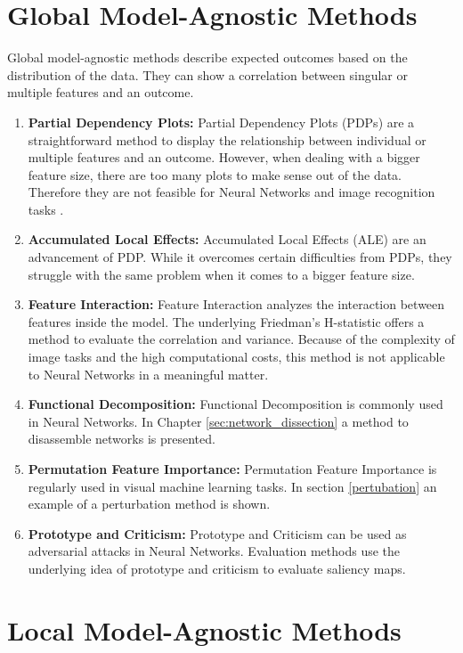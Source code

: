 \section{Global Model-Agnostic Methods}

Global model-agnostic methods describe expected outcomes based on the distribution of the data. They can show a correlation between singular or multiple features and an outcome.

\begin{enumerate}
	\item \textbf{Partial Dependency Plots:} Partial Dependency Plots (PDPs) are a straightforward method to display the relationship between individual or multiple features and an outcome. However, when dealing with a bigger feature size, there are too many plots to make sense out of the data. Therefore they are not feasible for Neural Networks and image recognition tasks \cite{PDP}.
	\item \textbf{Accumulated Local Effects:} Accumulated Local Effects (ALE) are an advancement of PDP. While it overcomes certain difficulties from PDPs, they struggle with the same problem when it comes to a bigger feature size.
	\item \textbf{Feature Interaction:} Feature Interaction analyzes the interaction between features inside the model. The underlying Friedman's H-statistic offers a method to evaluate the correlation and variance. Because of the complexity of image tasks and the high computational costs, this method is not applicable to Neural Networks in a meaningful matter.
	\item \textbf{Functional Decomposition:} Functional Decomposition is commonly used in Neural Networks. In Chapter \ref{sec:network_dissection} a method to disassemble networks is presented.
	\item \textbf{Permutation Feature Importance:} Permutation Feature Importance is regularly used in visual machine learning tasks. In section \ref{pertubation} an example of a perturbation method is shown.
	\item \textbf{Prototype and Criticism:} Prototype and Criticism can be used as adversarial attacks in Neural Networks. \cite{xu2019adversarial} Evaluation methods use the underlying idea of prototype and criticism to evaluate saliency maps.
	
\end{enumerate}


\section{Local Model-Agnostic Methods}

